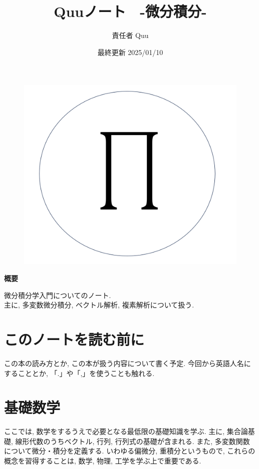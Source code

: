 \documentclass[a4j,dvipdfmx]{jsarticle}
\title{Quuノート　-微分積分\ajRoman{2}-}
\date{最終更新 2025/01/10}
\author{責任者 Quu}
\numberwithin{equation}{section}
\begin{document}
    \maketitle
        \thispagestyle{empty}
    \begin{figure}[h]
        \centering
        \includegraphics[scale=0.5]{img/QuuNote/QuuNote2/icon.png}
    \end{figure}
    
    \centerline{\textbf{概要}}
    \noindent
    微分積分学入門についてのノート.\\
    主に, 多変数微分積分, ベクトル解析, 複素解析について扱う.
    \clearpage
    　
    \clearpage
    \part*{このノートを読む前に}
        この本の読み方とか, この本が扱う内容について書く予定. 今回から英語人名にすることとか, 「.」や「,」を使うことも触れる.
    \clearpage
    \label{目次}
    \tableofcontents
    \clearpage

    \part{基礎数学}
    \begin{screen}
        ここでは, 数学をするうえで必要となる最低限の基礎知識を学ぶ. 主に, 集合論基礎, 線形代数のうちベクトル, 行列, 行列式の基礎が含まれる.
        また, 多変数関数について微分・積分を定義する. いわゆる偏微分, 重積分というもので, これらの概念を習得することは, 数学, 物理, 工学を学ぶ上で重要である.
    \end{screen}
    \clearpage
\end{document}
